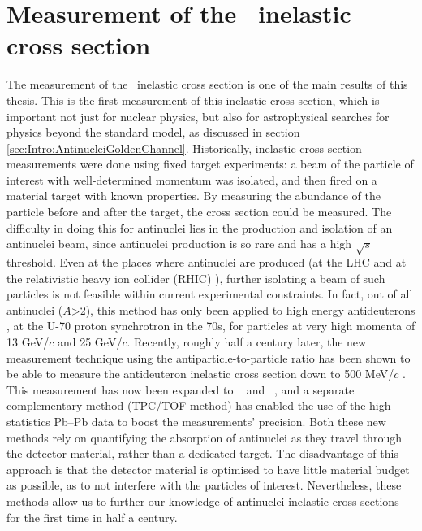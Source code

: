







\section{Measurement of the \ahe\ inelastic cross section}\label{sec:ResHe3SigmaInel}
The measurement of the \ahe\ inelastic cross section is one of the main results of this thesis. This is the first measurement of this inelastic cross section, which is important not just for nuclear physics, but also for astrophysical searches for physics beyond the standard model, as discussed in section \ref{sec:Intro:AntinucleiGoldenChannel}. Historically, inelastic cross section measurements were done using fixed target experiments: a beam of the particle of interest with well-determined momentum was isolated, and then fired on a material target with known properties. By measuring the abundance of the particle before and after the target, the cross section could be measured. The difficulty in doing this for antinuclei lies in the production and isolation of an antinuclei beam, since antinuclei production is so rare and has a high $\sqrt{s}$ threshold. Even at the places where antinuclei are produced (at the LHC and at the relativistic heavy ion collider (RHIC) \cite{RHIC}), further isolating a beam of such particles is not feasible within current experimental constraints. In fact, out of all antinuclei ($A$>2), this method has only been applied to high energy antideuterons \cite{Binon:1970yu, Denisov:1971im}, at the U-70 proton synchrotron in the 70s, for particles at very high momenta of 13 GeV/$c$ and 25 GeV/$c$. Recently, roughly half a century later, the new measurement technique using the antiparticle-to-particle ratio has been shown to be able to measure the antideuteron inelastic cross section down to 500 MeV/$c$ \cite{antideuteronXS}. This measurement has now been expanded to \ahe\ \cite{antiHe3XS} and \atrit\ , and a separate complementary method (TPC/TOF method) has enabled the use of the high statistics Pb--Pb data to boost the measurements' precision. Both these new methods rely on quantifying the absorption of antinuclei as they travel through the detector material, rather than a dedicated target. The disadvantage of this approach is that the detector material is optimised to have little material budget as possible, as to not interfere with the particles of interest. Nevertheless, these methods allow us to further our knowledge of antinuclei inelastic cross sections for the first time in half a century.

